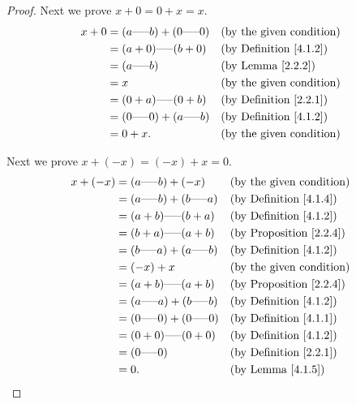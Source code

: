 \begin{proof}
    Next we prove \(x + 0 = 0 + x = x\).
    \begin{align*}
        x + 0 & = (a \text{-----} b) + (0 \text{-----} 0) &  & \text{(by the given condition)}    \\
              & = (a + 0) \text{-----} (b + 0)            &  & \text{(by Definition \ref{4.1.2})} \\
              & = (a \text{-----} b)                      &  & \text{(by Lemma \ref{2.2.2})}      \\
              & = x                                       &  & \text{(by the given condition)}    \\
              & = (0 + a) \text{-----} (0 + b)            &  & \text{(by Definition \ref{2.2.1})} \\
              & = (0 \text{-----} 0) + (a \text{-----} b) &  & \text{(by Definition \ref{4.1.2})} \\
              & = 0 + x.                                  &  & \text{(by the given condition)}
    \end{align*}

    Next we prove \(x + (-x) = (-x) + x = 0\).
    \begin{align*}
        x + (-x) & = (a \text{-----} b) + (-x)               &  & \text{(by the given condition)}     \\
                 & = (a \text{-----} b) + (b \text{-----} a) &  & \text{(by Definition \ref{4.1.4})}  \\
                 & = (a + b) \text{-----} (b + a)            &  & \text{(by Definition \ref{4.1.2})}  \\
                 & = (b + a) \text{-----} (a + b)            &  & \text{(by Proposition \ref{2.2.4})} \\
                 & = (b \text{-----} a) + (a \text{-----} b) &  & \text{(by Definition \ref{4.1.2})}  \\
                 & = (-x) + x                                &  & \text{(by the given condition)}     \\
                 & = (a + b) \text{-----} (a + b)            &  & \text{(by Proposition \ref{2.2.4})} \\
                 & = (a \text{-----} a) + (b \text{-----} b) &  & \text{(by Definition \ref{4.1.2})}  \\
                 & = (0 \text{-----} 0) + (0 \text{-----} 0) &  & \text{(by Definition \ref{4.1.1})}  \\
                 & = (0 + 0) \text{-----} (0 + 0)            &  & \text{(by Definition \ref{4.1.2})}  \\
                 & = (0 \text{-----} 0)                      &  & \text{(by Definition \ref{2.2.1})}  \\
                 & = 0.                                      &  & \text{(by Lemma \ref{4.1.5})}
    \end{align*}


\end{proof}

